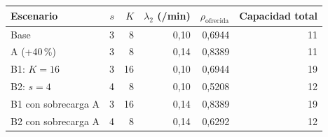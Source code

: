 \begin{tabular}{lrrrrr}
\toprule
Escenario & $s$ & $K$ & $\lambda_2$ (/min) & $\rho_{\text{ofrecida}}$ & Capacidad total \\
\midrule
Base & 3 & 8 & 0,10 & 0,6944 & 11 \\
A (+40\,\%) & 3 & 8 & 0,14 & 0,8389 & 11 \\
B1: $K=16$ & 3 & 16 & 0,10 & 0,6944 & 19 \\
B2: $s=4$ & 4 & 8 & 0,10 & 0,5208 & 12 \\
B1 con sobrecarga A & 3 & 16 & 0,14 & 0,8389 & 19 \\
B2 con sobrecarga A & 4 & 8 & 0,14 & 0,6292 & 12 \\
\bottomrule
\end{tabular}
